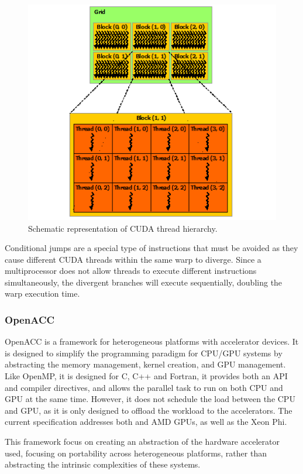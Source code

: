 \begin{figure}[!htp]
	\begin{center}
		\includegraphics[scale=0.9]{imgs/cuda_threads.png}
		\caption{Schematic representation of CUDA thread hierarchy.}
		\label{fig:cuda}
	\end{center}
\end{figure}

Conditional jumps are a special type of instructions that must be avoided as they cause different CUDA threads within the same warp to diverge. Since a multiprocessor does not allow threads to execute different instructions simultaneously, the divergent branches will execute sequentially, doubling the warp execution time.

\subsubsection*{OpenACC}

OpenACC \cite{OpenACC} is a framework for heterogeneous platforms with accelerator devices. It is designed to simplify the programming paradigm for CPU/GPU systems by abstracting the memory management, kernel creation, and GPU management. Like OpenMP, it is designed for C, C++ and Fortran, it provides both an API and compiler directives, and allows the parallel task to run on both CPU and GPU at the same time. However, it does not schedule the load between the CPU and GPU, as it is only designed to offload the workload to the accelerators. The current specification addresses both \nvidia and AMD GPUs, as well as the \intel Xeon Phi.

This framework focus on creating an abstraction of the hardware accelerator used, focusing on portability across heterogeneous platforms, rather than abstracting the intrinsic complexities of these systems.

